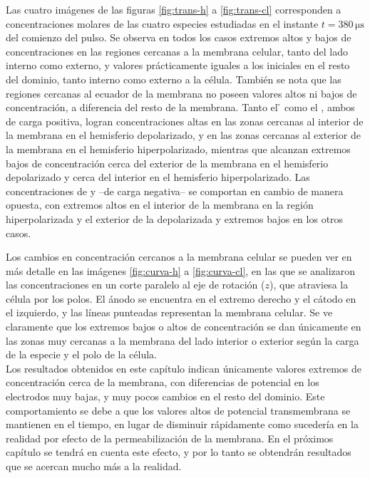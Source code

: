 

Las cuatro imágenes de las figuras \ref{fig:trans-h} a \ref{fig:trans-cl} corresponden a concentraciones molares de las cuatro especies estudiadas en el instante $t = 380 \, \si{\micro\second}$ del comienzo del pulso. Se observa en todos los casos extremos altos y bajos de concentraciones en las regiones cercanas a la membrana celular, tanto del lado interno como externo, y valores prácticamente iguales a los iniciales en el resto del dominio, tanto interno como externo a la célula. También se nota que las regiones cercanas al ecuador de la membrana no poseen valores altos ni bajos de concentración, a diferencia del resto de la membrana. Tanto el \h{} como el \na, ambos de carga positiva, logran concentraciones altas en las zonas cercanas al interior de la membrana en el hemisferio depolarizado, y en las zonas cercanas al exterior de la membrana en el hemisferio hiperpolarizado, mientras que alcanzan extremos bajos de concentración cerca del exterior de la membrana en el hemisferio depolarizado y cerca del interior en el hemisferio hiperpolarizado. Las concentraciones de \oh{} y \cl{} --de carga negativa-- se comportan en cambio de manera opuesta, con extremos altos en el interior de la membrana en la región hiperpolarizada y el exterior de la depolarizada y extremos bajos en los otros casos. 

Los cambios en concentración cercanos a la membrana celular se pueden ver en más detalle en las imágenes \ref{fig:curva-h} a \ref{fig:curva-cl}, en las que se analizaron las concentraciones en un corte paralelo al eje de rotación ($z$), que atraviesa la célula por los polos. El ánodo se encuentra en el extremo derecho y el cátodo en el izquierdo, y las líneas punteadas representan la membrana celular. Se ve claramente que los extremos bajos o altos de concentración se dan únicamente en las zonas muy cercanas a la membrana del lado interior o exterior según la carga de la especie y el polo de la célula.\\

Los resultados obtenidos en este capítulo indican únicamente valores extremos de concentración cerca de la membrana, con diferencias de potencial en los electrodos muy bajas, y muy pocos cambios en el resto del dominio. Este comportamiento se debe a que los valores altos de potencial transmembrana se mantienen en el tiempo, en lugar de disminuir rápidamente como sucedería en la realidad por efecto de la permeabilización de la membrana. En el próximos capítulo se tendrá en cuenta este efecto, y por lo tanto se obtendrán resultados que se acercan mucho más a la realidad.

